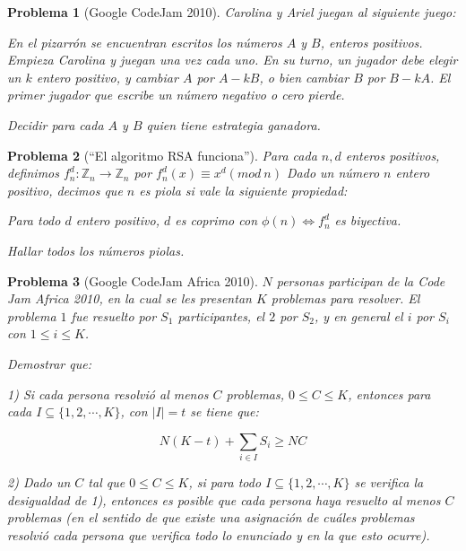 \documentclass{article}
\newtheorem{problema}{{\sc Problema}}
\begin{document}
\begin{problema}[Google CodeJam 2010]
Carolina y Ariel juegan al siguiente juego:

En el pizarrón se encuentran escritos los números $A$ y $B$, enteros positivos. Empieza Carolina y juegan una vez cada uno.
En su turno, un jugador debe elegir un $k$ entero positivo, y cambiar $A$ por $A - kB$, o bien cambiar $B$ por $B - kA$.
El primer jugador que escribe un número negativo o cero pierde.

Decidir para cada $A$ y $B$ quien tiene estrategia ganadora.
\end{problema}

\begin{problema}[``El algoritmo RSA funciona'']
Para cada $n,d$ enteros positivos, definimos $f_n^d : \mathbb{Z}_n \rightarrow \mathbb{Z}_n$ por $f_n^d(x) \equiv x^d (mod\ n)$
Dado un número $n$ entero positivo, decimos que $n$ es piola si vale la siguiente propiedad:

Para todo $d$ entero positivo, $d$ es coprimo con $\phi(n) \Leftrightarrow f_n^d$ es biyectiva.

Hallar todos los números piolas.
\end{problema}

\begin{problema}[Google CodeJam Africa 2010]
$N$ personas participan de la Code Jam Africa 2010, en la cual se les presentan $K$ problemas para resolver.
El problema $1$ fue resuelto por $S_1$ participantes, el $2$ por $S_2$, y en general el $i$ por $S_i$ con $1 \leq i \leq K$.

Demostrar que:

1) Si cada persona resolvió al menos $C$ problemas, $0 \leq C \leq K$, entonces para cada $I \subseteq \{1,2,\cdots,K\}$, con $|I| = t$ se tiene que:

$$N (K-t) + \sum_{i \in I}{S_i} \geq N C$$

2) Dado un $C$ tal que $0 \leq C \leq K$, si para todo $I \subseteq \{1,2,\cdots,K\}$ se verifica la desigualdad de 1), 
entonces es posible que cada persona haya resuelto al menos $C$ problemas 
(en el sentido de que existe una asignación de cuáles problemas resolvió cada persona que verifica todo lo enunciado y en la que esto ocurre).
\end{problema}
\end{document}
